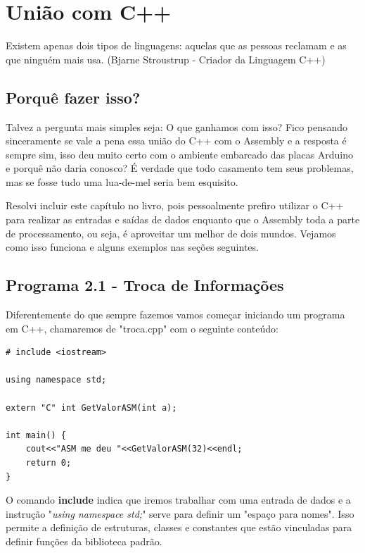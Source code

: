 \chapter{União com C++}

\begin{remark}
	Existem apenas dois tipos de linguagens: aquelas que as pessoas reclamam e as que ninguém mais usa. (Bjarne Stroustrup - Criador da Linguagem C++) 
\end{remark}

\section{Porquê fazer isso?}
Talvez a pergunta mais simples seja: O que ganhamos com isso? Fico pensando sinceramente se vale a pena essa união do C++ com o Assembly e a resposta é sempre sim, isso deu muito certo com o ambiente embarcado das placas Arduino e porquê não daria conosco? É verdade que todo casamento tem seus problemas, mas se fosse tudo uma lua-de-mel seria bem esquisito.

Resolvi incluir este capítulo no livro, pois pessoalmente prefiro utilizar o C++ para realizar as entradas e saídas de dados enquanto que o Assembly toda a parte de processamento, ou seja, é aproveitar um melhor de dois mundos. Vejamos como isso funciona e alguns exemplos nas seções seguintes.

\section{Programa 2.1 - Troca de Informações}

Diferentemente do que sempre fazemos vamos começar iniciando um programa em C++, chamaremos de "troca.cpp" com o seguinte conteúdo:
\begin{lstlisting}[]
# include <iostream>

using namespace std;

extern "C" int GetValorASM(int a);

int main() {
	cout<<"ASM me deu "<<GetValorASM(32)<<endl;
	return 0;
}
\end{lstlisting}

O comando \textbf{include} indica que iremos trabalhar com uma entrada de dados e a instrução "\textit{using namespace std;}" serve para definir um "espaço para nomes". Isso permite a definição de estruturas, classes e constantes que estão vinculadas para definir funções da biblioteca padrão. 

